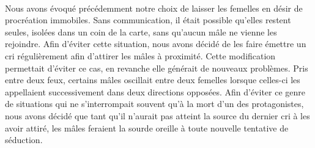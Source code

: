 \paragraph{}
Nous avons évoqué précédemment notre choix de laisser les femelles en désir de
procréation immobiles. Sans communication, il était possible qu'elles restent
seules, isolées dans un coin de la carte, sans qu'aucun mâle ne vienne les
rejoindre. Afin d'éviter cette situation, nous avons décidé de les faire émettre
un cri régulièrement afin d'attirer les mâles à proximité. Cette modification
permettait d'éviter ce cas, en revanche elle générait de nouveaux problèmes.
Pris entre deux feux, certains mâles oscillait entre deux femelles lorsque
celles-ci les appellaient successivement dans deux directions opposées. Afin
d'éviter ce genre de situations qui ne s'interrompait souvent qu'à la mort d'un
des protagonistes, nous avons décidé que tant qu'il n'aurait pas atteint la
source du dernier cri à les avoir attiré, les mâles feraient la sourde oreille à
toute nouvelle tentative de séduction.
